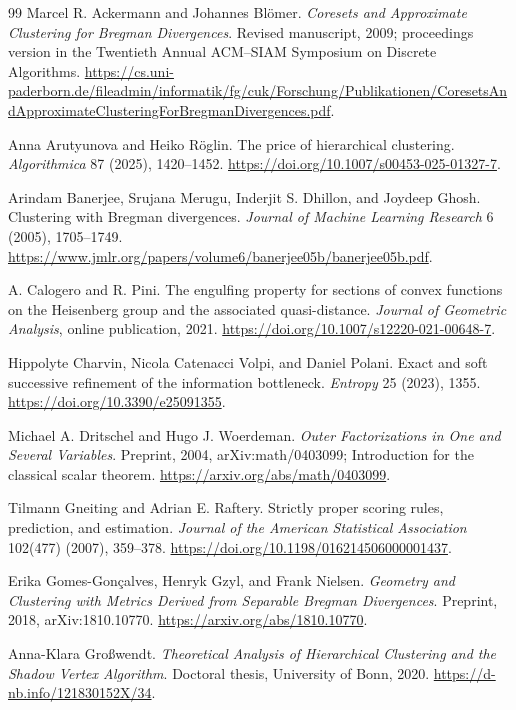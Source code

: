 \documentclass[11pt]{article}
\theoremstyle{definition}\newtheorem{definition}[theorem]{Definition}
\theoremstyle{remark}\newtheorem{remark}[theorem]{Remark}
\begin{document}
\begin{thebibliography}{99}
\small
{}
Marcel R. Ackermann and Johannes Bl\"omer.
\emph{Coresets and Approximate Clustering for Bregman Divergences}.
Revised manuscript, 2009; proceedings version in the Twentieth Annual ACM--SIAM Symposium on Discrete Algorithms.
\url{https://cs.uni-paderborn.de/fileadmin/informatik/fg/cuk/Forschung/Publikationen/CoresetsAndApproximateClusteringForBregmanDivergences.pdf}.

Anna Arutyunova and Heiko R\"oglin.
The price of hierarchical clustering.
\emph{Algorithmica} 87 (2025), 1420--1452.
\url{https://doi.org/10.1007/s00453-025-01327-7}.

Arindam Banerjee, Srujana Merugu, Inderjit S. Dhillon, and Joydeep Ghosh.
Clustering with Bregman divergences.
\emph{Journal of Machine Learning Research} 6 (2005), 1705--1749.
\url{https://www.jmlr.org/papers/volume6/banerjee05b/banerjee05b.pdf}.

A. Calogero and R. Pini.
The engulfing property for sections of convex functions on the Heisenberg group and the associated quasi-distance.
\emph{Journal of Geometric Analysis}, online publication, 2021.
\url{https://doi.org/10.1007/s12220-021-00648-7}.

Hippolyte Charvin, Nicola Catenacci Volpi, and Daniel Polani.
Exact and soft successive refinement of the information bottleneck.
\emph{Entropy} 25 (2023), 1355.
\url{https://doi.org/10.3390/e25091355}.

Michael A. Dritschel and Hugo J. Woerdeman.
\emph{Outer Factorizations in One and Several Variables}.
Preprint, 2004, arXiv:math/0403099; Introduction for the classical scalar theorem.
\url{https://arxiv.org/abs/math/0403099}.

Tilmann Gneiting and Adrian E. Raftery.
Strictly proper scoring rules, prediction, and estimation.
\emph{Journal of the American Statistical Association} 102(477) (2007), 359--378.
\url{https://doi.org/10.1198/016214506000001437}.

Erika Gomes-Gon\c calves, Henryk Gzyl, and Frank Nielsen.
\emph{Geometry and Clustering with Metrics Derived from Separable Bregman Divergences}.
Preprint, 2018, arXiv:1810.10770.
\url{https://arxiv.org/abs/1810.10770}.

Anna-Klara Gro\ss wendt.
\emph{Theoretical Analysis of Hierarchical Clustering and the Shadow Vertex Algorithm}.
Doctoral thesis, University of Bonn, 2020.
\url{https://d-nb.info/121830152X/34}.


\end{thebibliography}
\end{document}
